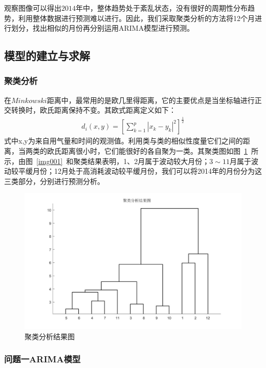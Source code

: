 \documentclass{whutmod}
\begin{document}
	观察图像可以得出$2014$年中，整体趋势处于紊乱状态，没有很好的周期性分布趋势，利用整体数据进行预测难以进行。因此，我们采取聚类分析的方法将12个月进行划分，找出相似的月份再分别运用ARIMA模型进行预测。
	\subsection{模型的建立与求解}
	\subsubsection{聚类分析}
	在$Minkowski$距离中，最常用的是欧几里得距离，它的主要优点是当坐标轴进行正交转换时，欧氏距离保持不变。其欧式距离定义如下：
	\begin{gather*}
	d_{i}(x,y)=\left [ \sum_{k=1}^{p}|x_{k}-y_{k}|^{2} \right ]^{\frac{1}{2}}
	\end{gather*}
	式中x,y为来自用气量和时间的观测值。利用类与类的相似性度量它们之间的距离，当两类的欧氏距离很小时，它们能很好的各自聚为一类。其聚类图如图~\ref{img1}~所示，由图~\ref{img001}~和聚类结果表明，1、2月属于波动较大月份；$3\sim11$月属于波动较平缓月份；12月处于高消耗波动较平缓月份，我们可以将2014年的月份分为这三类部分，分别进行预测分析。
	
	\begin{figure}[H]
		\centering
		\includegraphics[width=.7\textwidth]{figures/untitled.jpg}
		\caption{聚类分析结果图}\label{img1}
	\end{figure}
	
	\subsubsection{问题一ARIMA模型}
	
\end{document}
